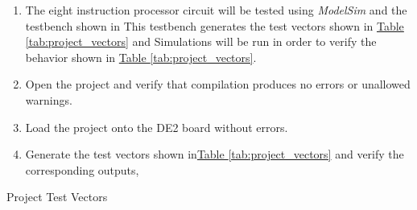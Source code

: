 \begin{enumerate}
    \item The eight instruction processor circuit will be tested using \emph{ModelSim} and the testbench shown in %
    This testbench generates the test vectors shown in \hyperref[tab:project_vectors]{Table \ref*{tab:project_vectors}}
    and %
    Simulations will be run in order to verify the behavior shown in
    \hyperref[tab:project_vectors]{Table \ref*{tab:project_vectors}}.
    \item Open the project and verify that compilation produces no errors or unallowed warnings.
    \item Load the project onto the DE2 board without errors.
    \item Generate the test vectors shown in\hyperref[tab:project_vectors]{Table \ref*{tab:project_vectors}}
    and verify the corresponding outputs,%
\end{enumerate}

\begin{table}[htbp]
    \centering
    \caption{Project Test Vectors\label{tab:project_vectors}}
\end{table}

